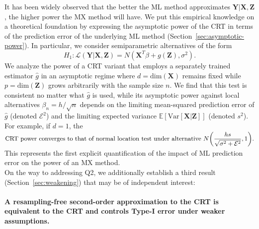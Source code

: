 \documentclass[12pt]{article}
\theoremstyle{definition}
\theoremstyle{remark}
\newcommand{\prx}{\bm X}
\newcommand{\prz}{\bm Z}
\newcommand{\pry}{{\bm Y}}
\begin{document}
It has been widely observed that the better the ML method approximates $\pry|\prx,\prz$, the higher power the MX method will have. We put this empirical knowledge on a theoretical foundation by expressing the asymptotic power of the CRT in terms of the prediction error of the underlying ML method (Section~\ref{sec:asymptotic-power}). In particular, we consider semiparametric alternatives of the form
\begin{equation}
	H_1: \mathcal L(\pry|\prx,\prz) = N(\prx^T\beta + g(\prz),\sigma^2).
	\label{parametric-alternative-intro}
\end{equation}
We analyze the power of a CRT variant that employs a separately trained estimator $\widehat g$ in an asymptotic regime where $d = \text{dim}(\prx)$ remains fixed while $p = \text{dim}(\prz)$ grows arbitrarily with the sample size $n$. We find that this test is consistent no matter what $\widehat g$ is used, while its asymptotic power against local alternatives $\beta_n = h/\sqrt{n}$ depends on the limiting mean-squared prediction error of $\widehat g$ (denoted $\mathcal E^2$) and the limiting expected variance $\mathbb E[\text{Var}[\prx | \prz]]$ (denoted $s^2$). For example, if $d = 1$, the
\begin{equation*}
	\begin{split}
		\text{CRT power converges to that of normal location test under alternative } N\smash{\left(\frac{hs}{\sqrt{\sigma^2 + \mathcal E^2}},1\right)}.
	\end{split}
\end{equation*}
This represents the first explicit quantification of the impact of ML prediction error on the power of an MX method. \\

On the way to addressing Q2, we additionally establish a third result (Section~\ref{sec:weakening}) that may be of independent interest:

\paragraph{A resampling-free second-order approximation to the CRT is equivalent to the CRT and controls Type-I error under weaker assumptions.}
\end{document}
